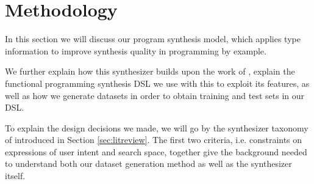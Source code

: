 \documentclass{article}
\begin{document}




\section{Methodology} %

In this section we will discuss our program synthesis model,
which applies type information to improve synthesis quality in programming by example.

We further explain how this synthesizer builds upon the work of \citet{nsps},
explain the functional programming synthesis DSL we use with this to exploit its features,
as well as how we generate datasets in order to obtain training and test sets in our DSL.

To explain the design decisions we made,
we will go by the synthesizer taxonomy of \citet{gulwani2017program} introduced in Section \ref{sec:litreview}.
The first two criteria, i.e. constraints on expressions of user intent and search space,
together give the background needed to understand both our dataset generation method as well as the synthesizer itself.
\end{document}
